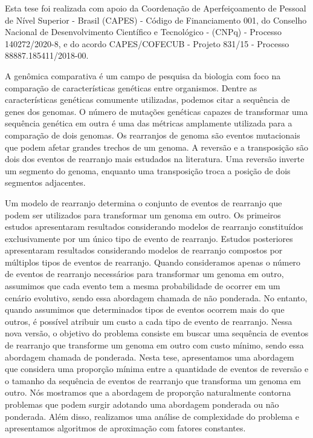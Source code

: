 \documentclass[Portugues,Final]{ic-tese-v3}
\theoremstyle{definition}
\theoremstyle{remark}
\theoremstyle{definition}
\begin{document}
Esta tese foi realizada com apoio da Coordenação de Aperfeiçoamento de Pessoal de Nível Superior - Brasil (CAPES) - Código de Financiamento 001, do Conselho Nacional de Desenvolvimento Científico e Tecnológico - (CNPq) - Processo 140272/2020-8, e do acordo CAPES/COFECUB - Projeto 831/15 - Processo 88887.185411/2018-00.

\begin{resumo}
A genômica comparativa é um campo de pesquisa da biologia com foco na comparação de características genéticas entre organismos. Dentre as características genéticas comumente utilizadas, podemos citar a sequência de genes dos genomas. O número de mutações genéticas capazes de transformar uma sequência genética em outra é uma das métricas amplamente utilizada para a comparação de dois genomas. Os rearranjos de genoma são eventos mutacionais que podem afetar grandes trechos de um genoma. A reversão e a transposição são dois dos eventos de rearranjo mais estudados na literatura. Uma reversão inverte um segmento do genoma, enquanto uma transposição troca a posição de dois segmentos adjacentes.

Um modelo de rearranjo determina o conjunto de eventos de rearranjo que podem ser utilizados para transformar um genoma em outro. Os primeiros estudos apresentaram resultados considerando modelos de rearranjo constituídos exclusivamente por um único tipo de evento de rearranjo. Estudos posteriores apresentaram resultados considerando modelos de rearranjo compostos por múltiplos tipos de eventos de rearranjo. Quando consideramos apenas o número de eventos de rearranjo necessários para transformar um genoma em outro, assumimos que cada evento tem a mesma probabilidade de ocorrer em um cenário evolutivo, sendo essa abordagem chamada de não ponderada. No entanto, quando assumimos que determinados tipos de eventos ocorrem mais do que outros, é possível atribuir um custo a cada tipo de evento de rearranjo. Nessa nova versão, o objetivo do problema consiste em buscar uma sequência de eventos de rearranjo que transforme um genoma em outro com custo mínimo, sendo essa abordagem chamada de ponderada. Nesta tese, apresentamos uma abordagem que considera uma proporção mínima entre a quantidade de eventos de reversão e o tamanho da sequência de eventos de rearranjo que transforma um genoma em outro. Nós mostramos que a abordagem de proporção naturalmente contorna problemas que podem surgir adotando uma abordagem ponderada ou não ponderada. Além disso, realizamos uma análise de complexidade do problema e apresentamos algoritmos de aproximação com fatores constantes.


\end{resumo}
\end{document}
